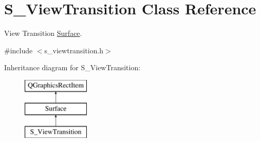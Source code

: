 \hypertarget{class_s___view_transition}{}\section{S\+\_\+\+View\+Transition Class Reference}
\label{class_s___view_transition}


View Transition \hyperlink{class_surface}{Surface}.  




{\ttfamily \#include $<$s\+\_\+viewtransition.\+h$>$}

Inheritance diagram for S\+\_\+\+View\+Transition\+:\begin{figure}[H]
\begin{center}
\leavevmode
\includegraphics[height=3.000000cm]{class_s___view_transition}
\end{center}
\end{figure}

